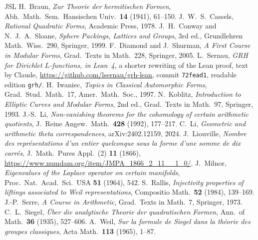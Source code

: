 \documentclass[reqno]{amsart}
\theoremstyle{definition}
\theoremstyle{plain}
\begin{document}
\begin{thebibliography}{JSL}
 H.~Braun, \emph{Zur Theorie der hermitischen Formen}, Abh.\ Math.\ Sem.\ Hansischen Univ.\ \textbf{14} (1941), 61--150.
 J.~W.~S.~Cassels, \emph{Rational Quadratic Forms}, Academic Press, 1978.
 J.~H.~Conway and N.~J.~A.~Sloane, \emph{Sphere Packings, Lattices and Groups}, 3rd ed., Grundlehren Math.\ Wiss.\ 290, Springer, 1999.
 F.~Diamond and J.~Shurman, \emph{A First Course in Modular Forms}, Grad.\ Texts in Math.\ 228, Springer, 2005.
 L.~Sernau, \emph{GRH for Dirichlet \(L\)-functions, in Lean~4}, a shorter rewriting of the Lean proof, text by Claude, \url{https://github.com/lsernau/grh-lean}, commit \texttt{72fead1}, readable edition \texttt{grh/}.
 H.~Iwaniec, \emph{Topics in Classical Automorphic Forms}, Grad.\ Stud.\ Math.\ 17, Amer.\ Math.\ Soc., 1997.
 N.~Koblitz, \emph{Introduction to Elliptic Curves and Modular Forms}, 2nd ed., Grad.\ Texts in Math.\ 97, Springer, 1993.
 J.-S.~Li, \emph{Non-vanishing theorems for the cohomology of certain arithmetic quotients}, J.\ Reine Angew.\ Math.\ \textbf{428} (1992), 177--217.
 C.~Li, \emph{Geometric and arithmetic theta correspondences}, arXiv:2402.12159, 2024.
 J.~Liouville, \emph{Nombre des repr\'esentations d'un entier quelconque sous la forme d'une somme de dix carr\'es}, J.\ Math.\ Pures Appl.\ (2) \textbf{11} (1866), \url{https://www.numdam.org/item/JMPA_1866_2_11__1_0/}.
 J.~Milnor, \emph{Eigenvalues of the Laplace operator on certain manifolds}, Proc.\ Nat.\ Acad.\ Sci.\ USA \textbf{51} (1964), 542.
 S.~Rallis, \emph{Injectivity properties of liftings associated to Weil representations}, Compositio Math.\ \textbf{52} (1984), 139--169.
 J.-P.~Serre, \emph{A Course in Arithmetic}, Grad.\ Texts in Math.\ 7, Springer, 1973.
 C.~L.~Siegel, \emph{\"Uber die analytische Theorie der quadratischen Formen}, Ann.\ of Math.\ \textbf{36} (1935), 527--606.
 A.~Weil, \emph{Sur la formule de Siegel dans la th\'eorie des groupes classiques}, Acta Math.\ \textbf{113} (1965), 1--87.
\end{thebibliography}
\end{document}

